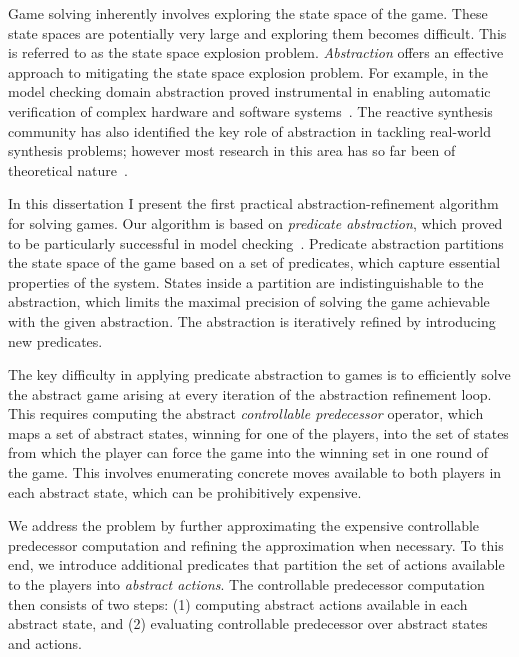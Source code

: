 Game solving inherently involves exploring the state space of the game. These state spaces are potentially very large and exploring them becomes difficult. This is referred to as the state space explosion problem. \emph{Abstraction} offers an effective approach to mitigating the state space explosion problem.  For example, in the model checking domain abstraction proved instrumental in enabling automatic verification of complex hardware and software systems~\cite{Clarke_GJLV_00,Clarke_KSY_04,Henzinger_JMS_02}.  The reactive synthesis community has also identified the key role of abstraction in tackling real-world synthesis problems; however most research in this area has so far been of theoretical nature~\cite{Alfaro_Roy_07,Henzinger_JM_03}.  

In this dissertation I present the first practical abstraction-refinement algorithm for solving games.  Our algorithm is based on \emph{predicate abstraction}, which proved to be particularly successful in model checking~\cite{Graf_Saidi_97}.  Predicate abstraction partitions the state space of the game based on a set of predicates, which capture essential properties of the system.  States inside a partition are indistinguishable to the abstraction, which limits the maximal precision of solving the game achievable with the given abstraction.  The abstraction is iteratively refined by introducing new predicates.

The key difficulty in applying predicate abstraction to games is to efficiently solve the abstract game arising at every iteration of the abstraction refinement loop.  This requires computing the abstract \emph{controllable predecessor} operator, which maps a set of abstract states, winning for one of the players, into the set of states from which the player can force the game into the winning set in one round of the game.  This involves enumerating concrete moves available to both players in each abstract state, which can be prohibitively expensive.  

We address the problem by further approximating the expensive controllable predecessor computation and refining the approximation when necessary. To this end, we introduce additional predicates that partition the set of actions available to the players into \emph{abstract actions}.  The controllable predecessor computation then consists of two steps: (1) computing abstract actions available in each abstract state, and (2) evaluating controllable predecessor over abstract states and actions.  

